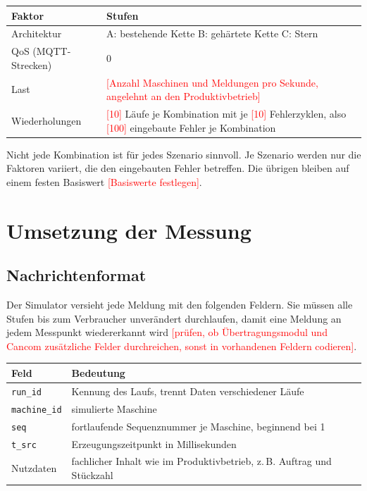 \documentclass[11pt, a4paper]{article}
\newcommand{\offen}[1]{\textcolor{red}{[#1]}}
\begin{document}
\begin{center}
\small
\begin{tabularx}{\textwidth}{@{}p{3.2cm} X@{}}
\toprule
\textbf{Faktor} & \textbf{Stufen} \\
\midrule
Architektur & A: bestehende Kette \quad B: gehärtete Kette \quad C: Stern \\
QoS (MQTT-Strecken) & 0 \quad 1 \quad 2 \\
Last & \offen{Anzahl Maschinen und Meldungen pro Sekunde, angelehnt an den Produktivbetrieb} \\
Wiederholungen & \offen{10} Läufe je Kombination mit je \offen{10} Fehlerzyklen, also \offen{100} eingebaute Fehler je Kombination \\
\bottomrule
\end{tabularx}
\end{center}

Nicht jede Kombination ist für jedes Szenario sinnvoll. Je Szenario werden nur die Faktoren variiert, die den eingebauten Fehler betreffen. Die übrigen bleiben auf einem festen Basiswert \offen{Basiswerte festlegen}.

\section{Umsetzung der Messung}

\subsection{Nachrichtenformat}

Der Simulator versieht jede Meldung mit den folgenden Feldern. Sie müssen alle Stufen bis zum Verbraucher unverändert durchlaufen, damit eine Meldung an jedem Messpunkt wiedererkannt wird \offen{prüfen, ob Übertragungsmodul und Cancom zusätzliche Felder durchreichen, sonst in vorhandenen Feldern codieren}.

\begin{center}
\small
\begin{tabularx}{\textwidth}{@{}p{3.0cm} X@{}}
\toprule
\textbf{Feld} & \textbf{Bedeutung} \\
\midrule
\texttt{run\_id} & Kennung des Laufs, trennt Daten verschiedener Läufe \\
\texttt{machine\_id} & simulierte Maschine \\
\texttt{seq} & fortlaufende Sequenznummer je Maschine, beginnend bei 1 \\
\texttt{t\_src} & Erzeugungszeitpunkt in Millisekunden \\
Nutzdaten & fachlicher Inhalt wie im Produktivbetrieb, z.\,B. Auftrag und Stückzahl \\
\bottomrule
\end{tabularx}
\end{center}
\end{document}
